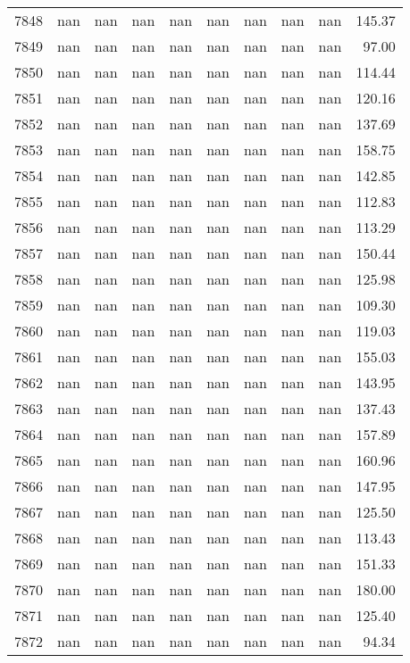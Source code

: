 \begin{tabular}{lrrrrrrrrr}
7848 & nan & nan & nan & nan & nan & nan & nan & nan & 145.37 \\
7849 & nan & nan & nan & nan & nan & nan & nan & nan & 97.00 \\
7850 & nan & nan & nan & nan & nan & nan & nan & nan & 114.44 \\
7851 & nan & nan & nan & nan & nan & nan & nan & nan & 120.16 \\
7852 & nan & nan & nan & nan & nan & nan & nan & nan & 137.69 \\
7853 & nan & nan & nan & nan & nan & nan & nan & nan & 158.75 \\
7854 & nan & nan & nan & nan & nan & nan & nan & nan & 142.85 \\
7855 & nan & nan & nan & nan & nan & nan & nan & nan & 112.83 \\
7856 & nan & nan & nan & nan & nan & nan & nan & nan & 113.29 \\
7857 & nan & nan & nan & nan & nan & nan & nan & nan & 150.44 \\
7858 & nan & nan & nan & nan & nan & nan & nan & nan & 125.98 \\
7859 & nan & nan & nan & nan & nan & nan & nan & nan & 109.30 \\
7860 & nan & nan & nan & nan & nan & nan & nan & nan & 119.03 \\
7861 & nan & nan & nan & nan & nan & nan & nan & nan & 155.03 \\
7862 & nan & nan & nan & nan & nan & nan & nan & nan & 143.95 \\
7863 & nan & nan & nan & nan & nan & nan & nan & nan & 137.43 \\
7864 & nan & nan & nan & nan & nan & nan & nan & nan & 157.89 \\
7865 & nan & nan & nan & nan & nan & nan & nan & nan & 160.96 \\
7866 & nan & nan & nan & nan & nan & nan & nan & nan & 147.95 \\
7867 & nan & nan & nan & nan & nan & nan & nan & nan & 125.50 \\
7868 & nan & nan & nan & nan & nan & nan & nan & nan & 113.43 \\
7869 & nan & nan & nan & nan & nan & nan & nan & nan & 151.33 \\
7870 & nan & nan & nan & nan & nan & nan & nan & nan & 180.00 \\
7871 & nan & nan & nan & nan & nan & nan & nan & nan & 125.40 \\
7872 & nan & nan & nan & nan & nan & nan & nan & nan & 94.34 \\

\end{tabular}
